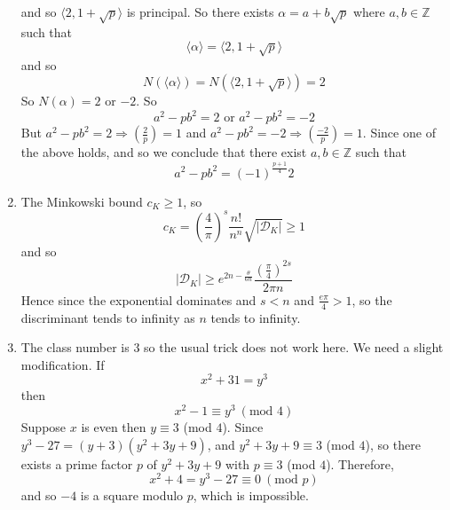 \begin{enumerate}
and so $\langle 2,1+\sqrt{p}\rangle$ is principal.
So there exists $\alpha=a+b\sqrt{p}$ where $a,b \in \mathbb{Z}$ such that
$$\langle \alpha \rangle =\langle 2,1+\sqrt{p} \rangle$$
and so
$$N(\langle \alpha \rangle)=N(\langle 2,1+\sqrt{p} \rangle)=2$$
So $N(\alpha)=2$ or $-2$. So
$$a^2-pb^2=2 \text{ or } a^2-pb^2=-2$$
But $a^2-pb^2=2 \Rightarrow (\frac{2}{p})=1$ and $a^2-pb^2=-2 \Rightarrow (\frac{-2}{p})=1$.
Since one of the above holds, and so we conclude that there exist $a,b \in \mathbb{Z}$ such that
$$a^2-pb^2=(-1)^{\frac{p+1}{4}}2$$
\item The Minkowski bound $c_K \ge 1$, so
$$c_K=\left(\frac{4}{\pi}\right)^s \frac{n!}{n^n} \sqrt{|\mathcal{D}_K|} \ge 1$$
and so
$$|\mathcal{D}_K| \ge e^{2n-\frac{\theta}{6n}}\frac{\left(\frac{\pi}{4}\right)^{2s}}{2\pi n}$$
Hence since the exponential dominates and $s<n$ and $\frac{e\pi}{4}>1$, so the discriminant tends to infinity
as $n$ tends to infinity. 
\item The class number is $3$ so the usual trick does not work here. We need a slight modification. If
$$x^2+31=y^3$$
then
$$x^2-1 \equiv y^3~(\text{mod } 4)$$
Suppose $x$ is even then $y \equiv 3$ (mod $4$). Since $y^3-27=(y+3)(y^2+3y+9)$, and
$y^2+3y+9 \equiv 3$ (mod $4$), so there exists a prime factor $p$ of $y^2+3y+9$ with
$p \equiv 3$ (mod $4$).  Therefore,
$$x^2+4=y^3-27 \equiv 0~(\text{mod } p)$$
and so $-4$ is a square modulo $p$, which is impossible.


\end{enumerate}
